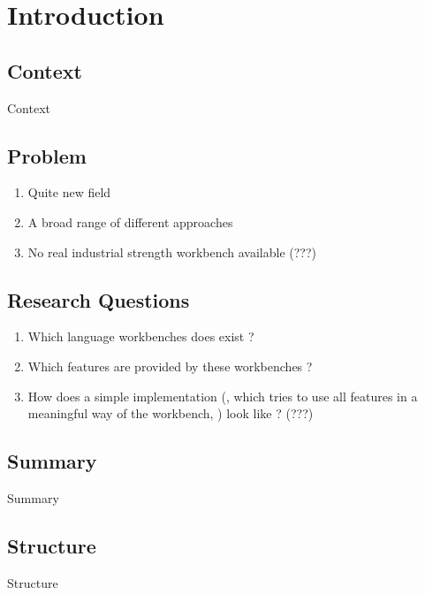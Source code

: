 \chapter{Introduction}

\section{Context}

Context

\newpage

\section{Problem}

\begin{enumerate}
  \item Quite new field
  \item A broad range of different approaches
  \item No real industrial strength workbench available (???)
\end{enumerate}

\newpage

\section{Research Questions}

\begin{enumerate}
  \item Which language workbenches does exist ?
  \item Which features are provided by these workbenches ?
  \item How does a simple implementation (, which tries to use all features in a meaningful way of the workbench, ) look like ? (???)
\end{enumerate}

\newpage

\section{Summary}

Summary

\newpage

\section{Structure}

Structure